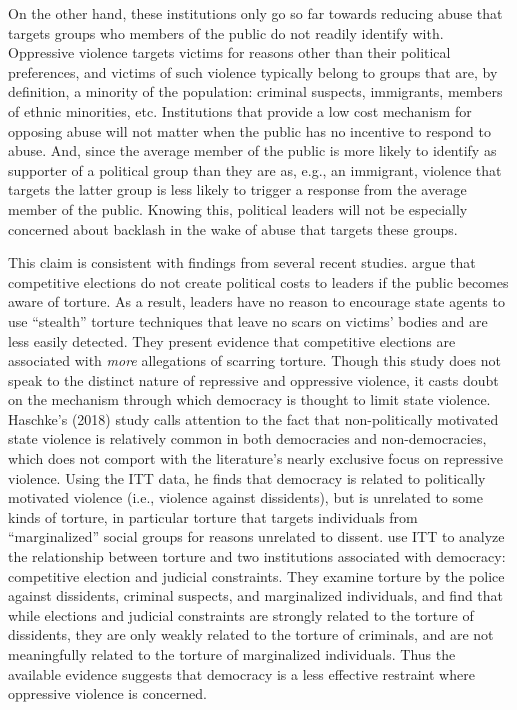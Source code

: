\documentclass[11pt]{article}
\begin{document}
On the other hand, these institutions only go so far towards reducing abuse that targets groups who members of the public do not readily identify with. Oppressive violence targets victims for reasons other than their political preferences, and victims of such violence typically belong to groups that are, by definition, a minority of the population: criminal suspects, immigrants, members of ethnic minorities, etc. Institutions that provide a low cost mechanism for opposing abuse will not matter when the public has no incentive to respond to abuse. And, since the average member of the public is more likely to identify as supporter of a political group than they are as, e.g., an immigrant, violence that targets the latter group is less likely to trigger a response from the average member of the public. Knowing this, political leaders will not be especially concerned about backlash in the wake of abuse that targets these groups. 

This claim is consistent with findings from several recent studies. \citet{ConradHillMoore2018} argue that competitive elections do not create political costs to leaders if the public becomes aware of torture. As a result, leaders have no reason to encourage state agents to use ``stealth'' torture techniques that leave no scars on victims' bodies and are less easily detected. They present evidence that competitive elections are associated with {\em more} allegations of scarring torture. Though this study does not speak to the distinct nature of repressive and oppressive violence, it casts doubt on the mechanism through which democracy is thought to limit state violence. Haschke's (2018) study calls attention to the fact that non-politically motivated state violence is relatively common in both democracies and non-democracies, which does not comport with the literature's nearly exclusive focus on repressive violence. Using the ITT data, he finds that democracy is related to politically motivated violence (i.e., violence against dissidents), but is unrelated to some kinds of torture, in particular torture that targets individuals from ``marginalized'' social groups for reasons unrelated to dissent. \citet{JacksonHillHall2018} use ITT to analyze the relationship between torture and two  institutions associated with democracy: competitive election and judicial constraints. They examine torture by the police against dissidents, criminal suspects, and marginalized individuals, and find that while elections and judicial constraints are strongly related to the torture of dissidents, they are only weakly related to the torture of criminals, and are not meaningfully related to the torture of marginalized individuals. Thus the available evidence suggests that democracy is a less effective restraint where oppressive violence is concerned.       
\end{document}
